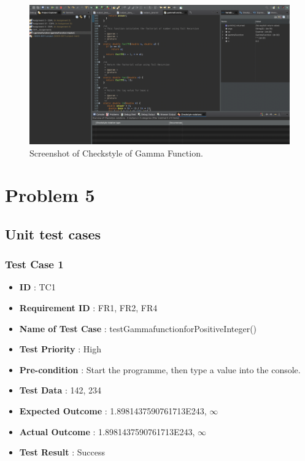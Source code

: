 \documentclass[12pt,a4paper]{report}
\begin{document}
\begin{figure}[h]
    \centering
    \includegraphics[width=0.9\linewidth]{Images/Typechecking.jpg}
    \caption{Screenshot of Checkstyle of Gamma Function.}
    \label{fig: Checkstyle tool}
\end{figure}

\newpage


\chapter{Problem 5}

\section{Unit test cases}

\subsection{Test Case 1}
\begin{itemize}
    \item \textbf{ID} : TC1
    \item \textbf{Requirement ID} : FR1, FR2, FR4
    \item \textbf{Name of Test Case} : testGammafunctionforPositiveInteger()
    \item \textbf{Test Priority} : High
    \item \textbf{Pre-condition} : Start the programme, then type a value into the console.
    \item \textbf{Test Data} : 142, 234
    \item \textbf{Expected Outcome} : 1.8981437590761713E243, $\infty$
    \item \textbf{Actual Outcome} : 1.8981437590761713E243, $\infty$
    \item \textbf{Test Result} : Success
\end{itemize}
\end{document}
